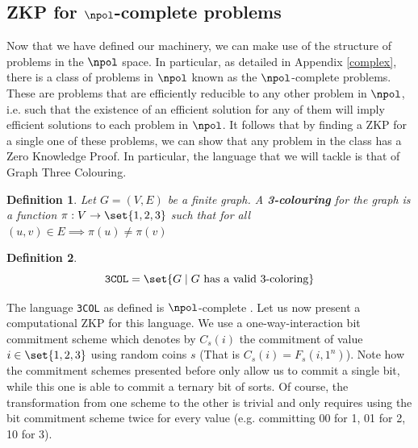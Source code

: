 \documentclass{article}
\newtheorem{definition}{Definition}
\begin{document}
\subsection{ZKP for \texorpdfstring{$\npol$}{NP}-complete problems}
\label{np}
Now that we have defined our machinery, we can make use of the structure of problems in the $\npol$ space.
In particular, as detailed in Appendix \ref{complex}, there is a class of problems in $\npol$ known as the $\npol$-complete problems.
These are problems that are efficiently reducible to any other problem in $\npol$, i.e. such that the existence of an efficient solution for any of them will imply efficient solutions to each problem in $\npol$.
It follows that by finding a ZKP for a single one of these problems, we can show that any problem in the class has a Zero Knowledge Proof.
In particular, the language that we will tackle is that of Graph Three Colouring.
\begin{definition}
    Let $G = (V, E)$ be a finite graph. A \textbf{3-colouring} for the graph is a function $\pi: V \to \set{1, 2, 3}$
    such that for all $(u, v) \in E \implies \pi(u) \neq \pi(v)$
\end{definition}
\begin{definition}
    \[ \texttt{3COL} = \set{ G \; | \; G \text{ has a valid 3-coloring} } \]
\end{definition}
The language \texttt{3COL} as defined is $\npol$-complete \cite{karpReducibilityCombinatorialProblems1972}.
Let us now present a computational ZKP \cite{goldreichProofsThatYield1991} \cite{goldreichMethodologyCryptographicProtocol} for this language. We use a one-way-interaction bit commitment scheme which denotes by
$C_s(i)$ the commitment of value $i \in \set{1, 2, 3}$ using random coins $s$ (That is $C_s(i) = F_s(i, 1^n)$). Note how the commitment schemes
presented before only allow us to commit a single bit, while this one is able to commit a ternary bit of sorts. Of course, the transformation
from one scheme to the other is trivial and only requires using the bit commitment scheme twice for every value (e.g. committing 00 for 1, 01 for 2, 10 for 3).
\end{document}
